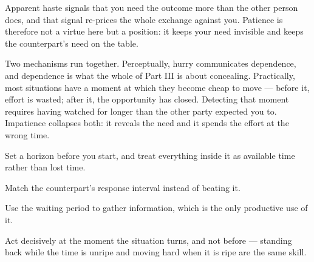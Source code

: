 


\begin{core}
Apparent haste signals that you need the outcome more than the other person does, and that signal re-prices the whole exchange against you. Patience is therefore not a virtue here but a position: it keeps your need invisible and keeps the counterpart's need on the table.
\end{core}

\begin{mechanism}
Two mechanisms run together. Perceptually, hurry communicates dependence, and dependence is what the whole of Part III is about concealing. Practically, most situations have a moment at which they become cheap to move --- before it, effort is wasted; after it, the opportunity has closed. Detecting that moment requires having watched for longer than the other party expected you to. Impatience collapses both: it reveals the need and it spends the effort at the wrong time.
\end{mechanism}

\begin{application}
  \item Set a horizon before you start, and treat everything inside it as available time rather than lost time.
  \item Match the counterpart's response interval instead of beating it.
  \item Use the waiting period to gather information, which is the only productive use of it.
  \item Act decisively at the moment the situation turns, and not before --- standing back while the time is unripe and moving hard when it is ripe are the same skill.
\end{application}

